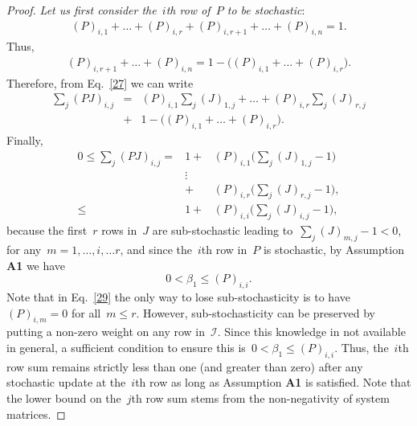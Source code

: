 \documentclass[draftclsnofoot, onecolumn, 12pt]{IEEEtran}
\def\mc{\mathcal}
\begin{document}
\begin{proof}
\emph{Let us first consider the~$i$th row of~$P$ to be stochastic}:
\begin{eqnarray*}
(P)_{i,1}+\ldots+(P)_{i,r}+(P)_{i,r+1}+\ldots+(P)_{i,n} = 1.
\end{eqnarray*}
Thus,
\begin{eqnarray*}
(P)_{i,r+1}+\ldots+(P)_{i,n} = 1 - \Big((P)_{i,1}+\ldots+(P)_{i,r}\Big).
\end{eqnarray*}
Therefore, from Eq.~\eqref{27} we can write
\begin{eqnarray}
\sum_{j}(PJ)_{i,j}&=&
(P)_{i,1}\sum_{j}(J)_{1,j}+ \ldots + (P)_{i,r}\sum_{j}(J)_{r,j}\nonumber\\
&+& 1- \Big((P)_{i,1}+\ldots+(P)_{i,r}\Big).
\end{eqnarray}
Finally,
\begin{eqnarray}\label{29}
0 \leq \sum_{j}(PJ)_{i,j} = & 1 +&  (P)_{i,1}\Bigg(\sum_{j}(J)_{1,j} -1\Bigg)\nonumber\\
&\vdots& \nonumber\\
&+& (P)_{i,r}\Bigg(\sum_{j}(J)_{r,j} -1\Bigg),\\
\leq & 1 +&  (P)_{i,i}\Bigg(\sum_{j}(J)_{i,j} -1\Bigg),\label{25}
\end{eqnarray}
because the first~$r$ rows in~$J$ are sub-stochastic leading to~$\sum_j(J)_{m,j}-1<0$, for any~$m=1,\ldots,i,\ldots r$, and since the~$i$th row in~$P$ is stochastic, by Assumption {\bf{A1}} we have
\[
0<\beta_1\leq (P)_{i,i}.
\]
Note that in Eq.~\eqref{29} the only way to lose sub-stochasticity is to have~$(P)_{i,m}=0$ for all~$m\leq r$. However, sub-stochasticity can be preserved by putting a non-zero weight on any row in~$\mc{I}$. Since this knowledge in not available in general, a sufficient condition to ensure this is~$0<\beta_1\leq(P)_{i,i}$. Thus, the~$i$th row sum remains strictly less than one (and greater than zero) after any stochastic update at the~$i$th row as long as Assumption {\bf{A1}} is satisfied. Note that the lower bound on the~$j$th row sum stems from the non-negativity of system matrices. 


\end{proof}
\end{document}

